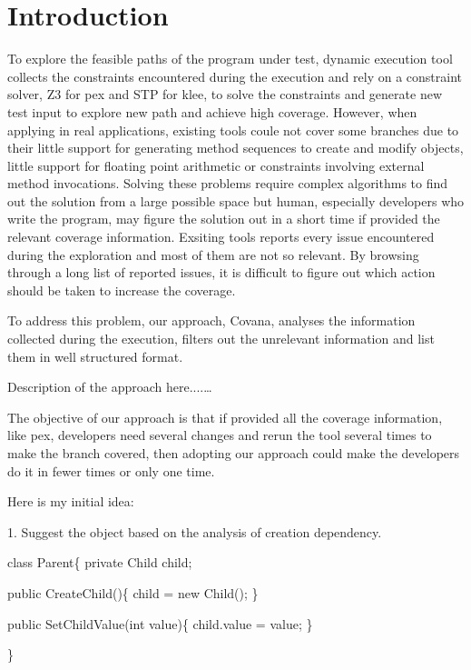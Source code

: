 \section{Introduction}

To explore the feasible paths of the program under test, dynamic execution tool collects the constraints encountered during the execution and rely on a constraint solver, Z3 for pex and STP for klee, to solve the constraints and generate new test input to explore new path and achieve high coverage. However, when applying in real applications, existing tools coule not cover some branches due to their little support for generating method sequences to create and modify objects, little support for floating point arithmetic or constraints involving external method invocations. Solving these problems require complex algorithms to find out the solution from a large possible space but human, especially developers who write the program, may figure the solution out in a short time if provided the relevant coverage information. Exsiting tools reports every issue encountered during the exploration and most of them are not so relevant. By browsing through a long list of reported issues, it is difficult to figure out which action should be taken to increase the coverage. 

To address this problem, our approach, Covana, analyses the information collected during the execution, filters out the unrelevant information and list them in well structured format. 

Description of the approach here....\dots

The objective of our approach is that if provided all the coverage information, like pex, developers need several changes and rerun the tool several times to make the branch covered, then adopting our approach could make the developers do it in fewer times or only one time.

Here is my initial idea:

1. Suggest the object based on the analysis of creation dependency.

\begin{scriptsize}
class Parent\{                                            
private Child child;                                      

public CreateChild()\{                              
	child = new Child();                                               
\}

public SetChildValue(int value)\{                              
	child.value = value;                                              
\}

\}

\end{scriptsize} 

